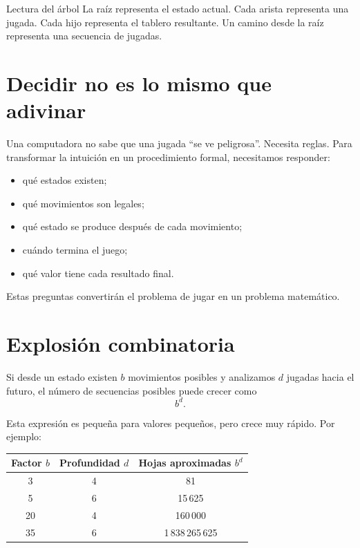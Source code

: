 \begin{stepbox}{Lectura del árbol}
La raíz representa el estado actual. Cada arista representa una jugada. Cada hijo representa el tablero resultante. Un camino desde la raíz representa una secuencia de jugadas.
\end{stepbox}

\section{Decidir no es lo mismo que adivinar}

Una computadora no sabe que una jugada ``se ve peligrosa''. Necesita reglas. Para transformar la intuición en un procedimiento formal, necesitamos responder:

\begin{itemize}
\item qué estados existen;
\item qué movimientos son legales;
\item qué estado se produce después de cada movimiento;
\item cuándo termina el juego;
\item qué valor tiene cada resultado final.
\end{itemize}

Estas preguntas convertirán el problema de jugar en un problema matemático.

\section{Explosión combinatoria}

Si desde un estado existen $b$ movimientos posibles y analizamos $d$ jugadas hacia el futuro, el número de secuencias posibles puede crecer como
\[
b^d.
\]

Esta expresión es pequeña para valores pequeños, pero crece muy rápido. Por ejemplo:

\begin{center}
\begin{tabular}{ccc}
\toprule
Factor $b$ & Profundidad $d$ & Hojas aproximadas $b^d$\\
\midrule
3 & 4 & 81\\
5 & 6 & 15\,625\\
20 & 4 & 160\,000\\
35 & 6 & 1\,838\,265\,625\\
\bottomrule
\end{tabular}
\end{center}

